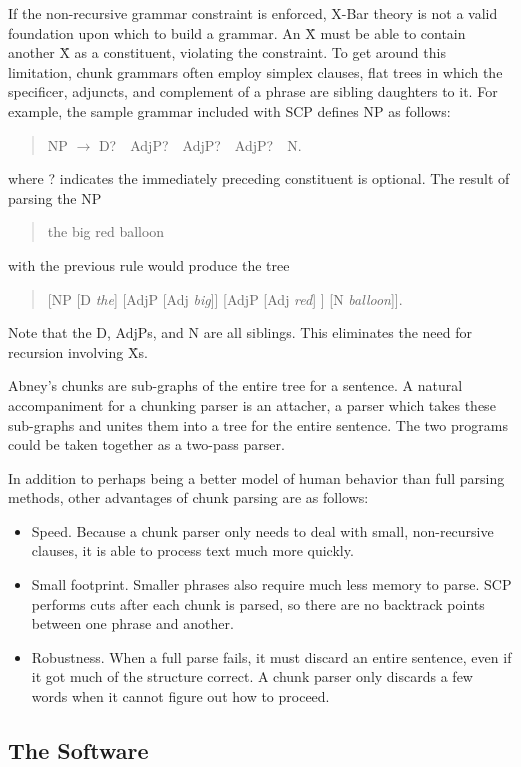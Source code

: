 \documentclass[12pt]{article}
\begin{document}
If the non-recursive grammar constraint is enforced, X-Bar theory is not a valid foundation upon which to build a grammar.  An \={X} must be able to contain another \={X} as a constituent, violating the constraint.  To get around this limitation, chunk grammars often employ simplex clauses, flat trees in which the specificer, adjuncts, and complement of a phrase are sibling daughters to it.  For example, the sample grammar included with SCP defines NP as follows:
\begin{quote}
NP $\longrightarrow$ D?~~AdjP?~~AdjP?~~AdjP?~~N.
\end{quote}
where ? indicates the immediately preceding constituent is optional.  The result of parsing the NP
\begin{quote}
the big red balloon
\end{quote}
with the previous rule would produce the tree
\begin{quote}
[NP [D \emph{the}] [AdjP [Adj \emph{big}]] [AdjP [Adj \emph{red}] ] [N \emph{balloon}]].
\end{quote}
Note that the D, AdjPs, and N are all siblings.  This eliminates the need for recursion involving \={X}s.

Abney's chunks are sub-graphs of the entire tree for a sentence.  A natural accompaniment for a chunking parser is an attacher, a parser which takes these sub-graphs and unites them into a tree for the entire sentence.  The two programs could be taken together as a two-pass parser.

In addition to perhaps being a better model of human behavior than full parsing methods, other advantages of chunk parsing are as follows:
\begin{itemize}
\item Speed.  Because a chunk parser only needs to deal with small, non-recursive clauses, it is able to process text much more quickly.
\item Small footprint.  Smaller phrases also require much less memory to parse.  SCP performs cuts after each chunk is parsed, so there are no backtrack points between one phrase and another.
\item Robustness.  When a full parse fails, it must discard an entire sentence, even if it got much of the structure correct.  A chunk parser only discards a few words when it cannot figure out how to proceed.
\end{itemize}

\subsection{The Software}
\end{document}
